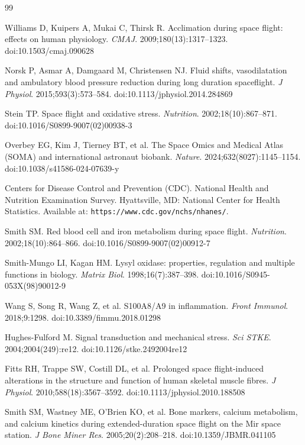 \documentclass[11pt,a4paper]{article}
\begin{document}
\begin{thebibliography}{99}

Williams D, Kuipers A, Mukai C, Thirsk R. Acclimation during space flight: effects on human physiology. \textit{CMAJ}. 2009;180(13):1317--1323. doi:10.1503/cmaj.090628

Norsk P, Asmar A, Damgaard M, Christensen NJ. Fluid shifts, vasodilatation and ambulatory blood pressure reduction during long duration spaceflight. \textit{J Physiol}. 2015;593(3):573--584. doi:10.1113/jphysiol.2014.284869

Stein TP. Space flight and oxidative stress. \textit{Nutrition}. 2002;18(10):867--871. doi:10.1016/S0899-9007(02)00938-3

Overbey EG, Kim J, Tierney BT, et al. The Space Omics and Medical Atlas (SOMA) and international astronaut biobank. \textit{Nature}. 2024;632(8027):1145--1154. doi:10.1038/s41586-024-07639-y

Centers for Disease Control and Prevention (CDC). National Health and Nutrition Examination Survey. Hyattsville, MD: National Center for Health Statistics. Available at: \texttt{https://www.cdc.gov/nchs/nhanes/}.

Smith SM. Red blood cell and iron metabolism during space flight. \textit{Nutrition}. 2002;18(10):864--866. doi:10.1016/S0899-9007(02)00912-7

Smith-Mungo LI, Kagan HM. Lysyl oxidase: properties, regulation and multiple functions in biology. \textit{Matrix Biol}. 1998;16(7):387--398. doi:10.1016/S0945-053X(98)90012-9

Wang S, Song R, Wang Z, et al. S100A8/A9 in inflammation. \textit{Front Immunol}. 2018;9:1298. doi:10.3389/fimmu.2018.01298

Hughes-Fulford M. Signal transduction and mechanical stress. \textit{Sci STKE}. 2004;2004(249):re12. doi:10.1126/stke.2492004re12

Fitts RH, Trappe SW, Costill DL, et al. Prolonged space flight-induced alterations in the structure and function of human skeletal muscle fibres. \textit{J Physiol}. 2010;588(18):3567--3592. doi:10.1113/jphysiol.2010.188508

Smith SM, Wastney ME, O'Brien KO, et al. Bone markers, calcium metabolism, and calcium kinetics during extended-duration space flight on the Mir space station. \textit{J Bone Miner Res}. 2005;20(2):208--218. doi:10.1359/JBMR.041105


\end{thebibliography}
\end{document}
